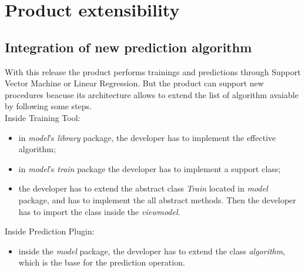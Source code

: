 \section{Product extensibility}
\subsection{Integration of new prediction algorithm}
With this release the product performs trainings and predictions through Support Vector Machine or Linear Regression. But the product can support new procedures beacuse its architecture allows to extend the list of algorithm avaiable by following some steps.\\
Inside Training Tool:
\begin{itemize}
\item in \textit{model}'s \textit{library} package, the developer has to implement the effective algorithm;
\item in \textit{model}'s \textit{train} package the developer has to implement a support class;
\item the developer has to extend the abstract class \textit{Train} located in \textit{model} package, and has to implement the all abstract methods. Then the developer has to import the class inside the \textit{viewmodel}.
\end{itemize}
Inside Prediction Plugin:
\begin{itemize}
\item inside the \textit{model} package, the developer has to extend the class \textit{algorithm}, which is the base for the prediction operation.
\end{itemize}
